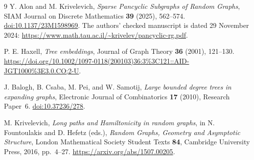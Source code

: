 \documentclass[11pt]{article}
\begin{document}
\begin{thebibliography}{9}
Y. Alon and M. Krivelevich,
\emph{Sparse Pancyclic Subgraphs of Random Graphs},
SIAM Journal on Discrete Mathematics \textbf{39} (2025), 562--574.
\href{https://doi.org/10.1137/23M1598969}{doi:10.1137/23M1598969}.
The authors' checked manuscript is dated 29 November 2024:
\url{https://www.math.tau.ac.il/~krivelev/pancyclic-rg.pdf}.

P. E. Haxell, \emph{Tree embeddings},
Journal of Graph Theory \textbf{36} (2001), 121--130.
\url{https://doi.org/10.1002/1097-0118(200103)36:3\%3C121::AID-JGT1000\%3E3.0.CO;2-U}.

J. Balogh, B. Csaba, M. Pei, and W. Samotij,
\emph{Large bounded degree trees in expanding graphs},
Electronic Journal of Combinatorics \textbf{17} (2010), Research Paper~6.
\href{https://doi.org/10.37236/278}{doi:10.37236/278}.

M. Krivelevich, \emph{Long paths and Hamiltonicity in random graphs},
in N. Fountoulakis and D. Hefetz (eds.),
\emph{Random Graphs, Geometry and Asymptotic Structure},
London Mathematical Society Student Texts \textbf{84}, Cambridge University Press, 2016, pp.~4--27.
\url{https://arxiv.org/abs/1507.00205}.
\end{thebibliography}
\end{document}
